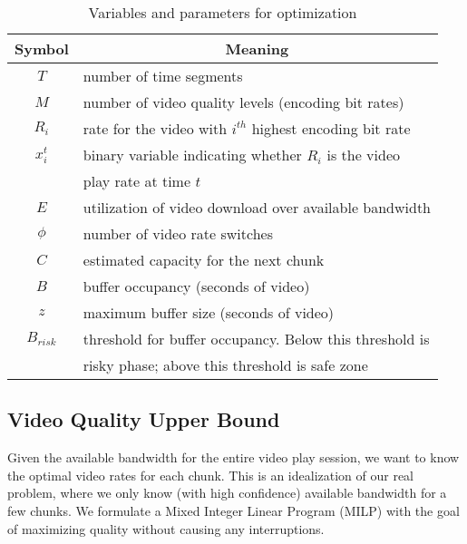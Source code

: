 \begin{table} [bt]
\small
\begin{tabular} {|c |l |}
\hline
\textbf{Symbol}&\multicolumn{1}{c|}{\textbf{Meaning} }\\ \hline
$T$ &number of time segments\\ \hline
$M$ &number of video quality levels (encoding bit rates)\\ \hline
$R_i$& rate for the video with $i^{th}$ highest encoding bit rate \\ \hline
$x_i^t$& binary variable indicating whether $R_i$ is the video \\
& play rate at time $t$ \\ \hline
$E$& utilization of video download over available bandwidth \\ \hline
$\phi$ &number of video rate switches \\ \hline
$C $ & estimated capacity for the next chunk\\ \hline
$B $ & buffer occupancy (seconds of video) \\ \hline
$z $ &maximum buffer size (seconds of video) \\ \hline
$B_{risk} $ & threshold for buffer occupancy. Below this threshold is\\
& 
risky phase; above this threshold is safe zone \\ \hline
\end{tabular}
\centering
\caption{Variables and parameters for optimization}
\label{tab:notation}
\end{table}
\subsection{Video Quality Upper Bound}\label{subsec:offline}

Given the available bandwidth for the entire video play
session, we want to know the optimal video rates for each chunk. This
is an idealization of our real problem, where we only know (with high
confidence) available bandwidth for a few chunks.
We formulate a Mixed Integer Linear Program (MILP) with the goal of
maximizing quality without causing any interruptions.



